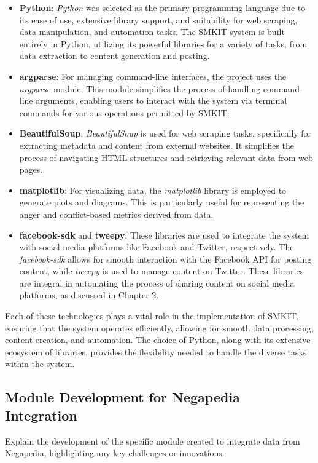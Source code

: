 \begin{itemize}
    \item \textbf{Python}: \textit{Python} was selected as the primary programming language due to its ease of use, extensive library support, and suitability for web scraping, data manipulation, and automation tasks. The SMKIT system is built entirely in Python, utilizing its powerful libraries for a variety of tasks, from data extraction to content generation and posting.
    
    \item \textbf{argparse}: For managing command-line interfaces, the project uses the \textit{argparse} module. This module simplifies the process of handling command-line arguments, enabling users to interact with the system via terminal commands for various operations permitted by SMKIT.

    \item \textbf{BeautifulSoup}: \textit{BeautifulSoup} is used for web scraping tasks, specifically for extracting metadata and content from external websites. It simplifies the process of navigating HTML structures and retrieving relevant data from web pages.

    \item \textbf{matplotlib}: For visualizing data, the \textit{matplotlib} library is employed to generate plots and diagrams. This is particularly useful for representing the anger and conflict-based metrics derived from data.
    
    \item \textbf{facebook-sdk} and \textbf{tweepy}: These libraries are used to integrate the system with social media platforms like Facebook and Twitter, respectively. The \textit{facebook-sdk} allows for smooth interaction with the Facebook API for posting content, while \textit{tweepy} is used to manage content on Twitter. These libraries are integral in automating the process of sharing content on social media platforms, as discussed in Chapter 2.

\end{itemize}

Each of these technologies plays a vital role in the implementation of SMKIT, ensuring that the system operates efficiently, allowing for smooth data processing, content creation, and automation. The choice of Python, along with its extensive ecosystem of libraries, provides the flexibility needed to handle the diverse tasks within the system.

\subsection{Module Development for Negapedia Integration}
\label{subsec:module_development_negapedia}
Explain the development of the specific module created to integrate data from Negapedia, highlighting any key challenges or innovations.

